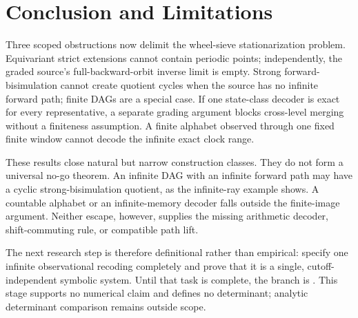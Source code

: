 \section{Conclusion and Limitations}
\label{sec:conclusion}

Three scoped obstructions now delimit the wheel-sieve stationarization
problem.  Equivariant strict extensions cannot contain periodic points;
independently, the graded source's full-backward-orbit inverse limit is
empty.  Strong forward-bisimulation
cannot create quotient cycles when the source has no infinite forward path;
finite DAGs are a special case.  If one state-class decoder is exact for every
representative, a separate grading argument blocks cross-level merging
without a finiteness assumption.  A finite alphabet observed through one
fixed finite window cannot decode the infinite exact clock range.

These results close natural but narrow construction classes.  They do not
form a universal no-go theorem.  An infinite DAG with an infinite forward
path may have a cyclic strong-bisimulation quotient, as the infinite-ray
example shows.  A countable alphabet or an infinite-memory decoder falls
outside the finite-image argument.  Neither escape, however, supplies the
missing arithmetic decoder, shift-commuting rule, or compatible path lift.

The next research step is therefore definitional rather than empirical:
specify one infinite observational recoding completely and prove that it is
a single, cutoff-independent symbolic system.  Until that task is complete, the branch
is \notestable.  This stage supports no numerical claim and defines no
determinant; analytic determinant comparison remains outside scope.
